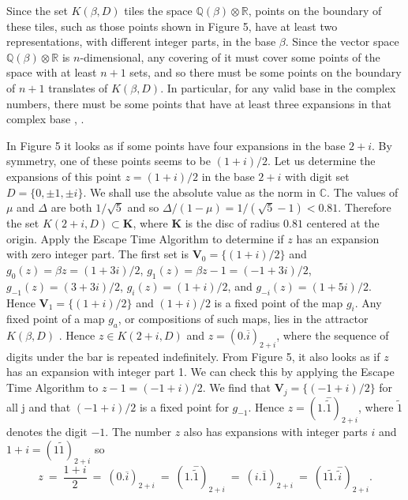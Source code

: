 \documentclass[12pt]{article}
\newcommand{\C}{\mathbb{C}}
\newcommand{\Q}{\mathbb{Q}}
\newcommand{\R}{\mathbb{R}}
\begin{document}
    Since the set $K(\beta, D)$ tiles the space $\Q(\beta)\otimes\R$, points on the boundary
of these tiles, such as those points shown in Figure 5, have at least two
representations, with different integer parts, in the base $\beta$. 
Since the vector space $\Q(\beta)\otimes\R$ is $n$-dimensional, any covering of it must cover some points
of the space with at least $n + 1$ sets, and so there must be some points on
the boundary of $n + 1$ translates of $K(\beta, D)$.
In particular, for any valid
base in the complex numbers, there must be some points that have at least
three expansions in that complex base \cite{intell}, \cite{threeexps}.

    In Figure 5 it looks as if some points have four expansions in the base
$2 + i$.  By symmetry, one of these points seems to be $(1 + i)/2$.  Let us
determine the expansions of this point $z = (1 + i)/2$ in the base $2 + i$ with
digit set $D = \{0, \pm1, \pm i\}$. 
We shall use the absolute value as the norm in $\C$.
The values of $\mu$ and $\Delta$ are both $1/\sqrt5$ and so 
$\Delta/(1-\mu)=1/(\sqrt5-1)<0.81$.
Therefore the set $K(2+i, D)\subset\mathbf{K}$, where $\mathbf{K}$ is the disc of radius $0.81$ centered
at the origin. Apply the Escape Time Algorithm to determine if $z$ has an
expansion with zero integer part.  The first set is 
$\mathbf{V}_0=\{(1+i)/2\}$ and
$g_0(z)=\beta z=(1+3i)/2$, $g_1(z)=\beta z - 1=(-1+3i)/2$, $g_{-1}(z)=(3+3i)/2$, $g_i(z)=(1+i)/2$, and $g_{-i}(z)=(1+5i)/2$. 
Hence $\mathbf{V}_1=\{(1+i)/2\}$ and $(1 +i)/2$
is a fixed point of the map $g_i$. Any fixed point of a map $g_a$, or compositions
of such maps, lies in the attractor $K(\beta, D)$ \cite{hutchinson}. 
Hence $z\in K(2 + i, D)$ and
$z = (0.\overline{i})_{2+i}$, where the sequence of digits under the bar is repeated indefinitely.
From Figure 5, it also looks as if $z$ has an expansion with integer part 1. 
We can check this by applying the Escape Time Algorithm to $z-1 = (-1 + i)/2$.
We find that $\mathbf{V}_j=\{(-1+i)/2\}$ for all j and that $(-1 + i)/2$ is a fixed point
for $g_{-1}$. Hence $z = (1.\stackrel{-}{\tilde{1}})_{2+i}$, where $\tilde{1}$ denotes the digit $-1$. The number $z$
also has expansions with integer parts $i$ and $1 + i = (1\tilde{1})_{2+i}$ so
$$
z \ = \ \frac{1+i}2 \ = \ (0.\overline{i})_{2+i} \ = \ (1.\stackrel{-}{\tilde{1}})_{2+i} \ = \ (i.\overline{1})_{2+i} \ = \ (1\tilde{1}.\stackrel{-}{\tilde{i}})_{2+i}. 
$$
\end{document}
